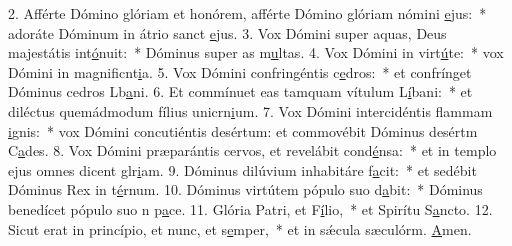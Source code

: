 2. Afférte Dómino glóriam et honórem, afférte Dómino glóriam nómini \uline{e}jus:~* adoráte Dóminum in átrio sanct \uline{e}jus.
3. Vox Dómini super aquas, Deus majestátis int\uline{ó}nuit:~* Dóminus super as m\uline{u}ltas.
4. Vox Dómini in virt\uline{ú}te:~* vox Dómini in magnificnt\uline{i}a.
5. Vox Dómini confringéntis c\uline{e}dros:~* et confrínget Dóminus cedros Lb\uline{a}ni.
6. Et commínuet eas tamquam vítulum L\uline{í}bani:~* et diléctus quemádmodum fílius unicrn\uline{i}um.
7. Vox Dómini intercidéntis flammam \uline{i}gnis:~* vox Dómini concutiéntis desértum: et commovébit Dóminus desértm C\uline{a}des.
8. Vox Dómini præparántis cervos, et revelábit cond\uline{é}nsa:~* et in templo ejus omnes dicent glr\uline{i}am.
9. Dóminus dilúvium inhabitáre f\uline{a}cit:~* et sedébit Dóminus Rex in t\uline{é}rnum.
10. Dóminus virtútem pópulo suo d\uline{a}bit:~* Dóminus benedícet pópulo suo n p\uline{a}ce.
11. Glória Patri, et F\uline{í}lio,~* et Spirítu S\uline{a}ncto.
12. Sicut erat in princípio, et nunc, et s\uline{e}mper,~* et in sǽcula sæculórm. \uline{A}men.
